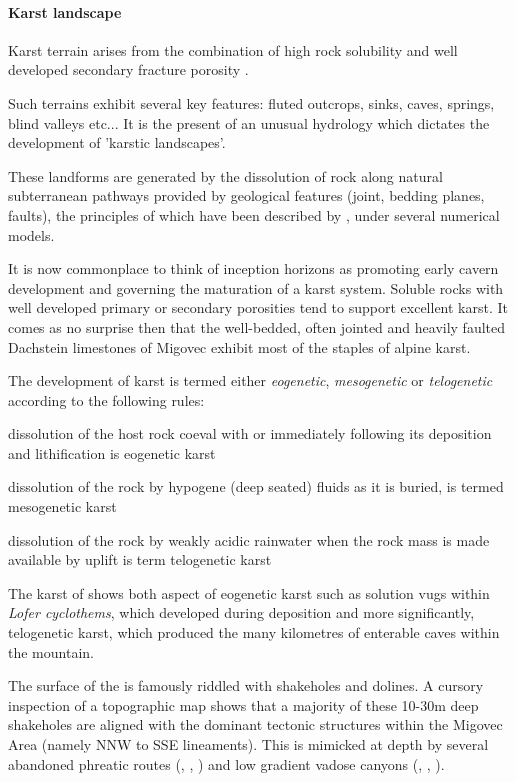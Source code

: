  \paragraph{Karst landscape}
Karst terrain arises from the combination of high rock solubility and well developed secondary fracture porosity \citep{ford2013karst}. 

Such terrains exhibit several key features: fluted outcrops, sinks, caves, springs, blind valleys etc... It is the present of an unusual hydrology which dictates the development of 'karstic landscapes'. 

These landforms are generated by the dissolution of rock along natural subterranean pathways provided by geological features (joint, bedding planes, faults), the principles of which have been described by \citet{dreybrodt1996principles}, under several numerical models.

It is now commonplace to think of inception horizons \citep{lowe1997carbonate} as promoting early cavern development and governing the maturation of a karst system. Soluble rocks with well developed primary or secondary porosities tend to support excellent karst. It comes as no surprise then that the well-bedded, often jointed and heavily faulted Dachstein limestones of Migovec exhibit most of the staples of alpine karst.

The development of karst is termed either \emph{eogenetic}, \emph{mesogenetic} or \emph{telogenetic} according to the following rules:
\begin{citemize}
\item dissolution of the host rock coeval with or immediately following its deposition and lithification is eogenetic karst 
\item dissolution of the rock by hypogene (deep seated) fluids as it is buried, is termed mesogenetic karst
\item dissolution of the rock by weakly acidic rainwater when the rock mass is made available by uplift is term telogenetic karst
\end{citemize}

The karst of  shows both aspect of eogenetic karst such as solution vugs within \emph{Lofer cyclothems}, which developed during deposition and more significantly, telogenetic karst, which produced the many kilometres of enterable caves within the mountain.

The surface of the  is famously riddled with shakeholes and dolines. A cursory inspection of a topographic map shows that a majority of these 10-30m deep shakeholes are aligned with the dominant tectonic structures within the Migovec Area (namely NNW to SSE lineaments). This is mimicked at depth by several abandoned phreatic routes (, , ) and low gradient vadose canyons (, , ).

